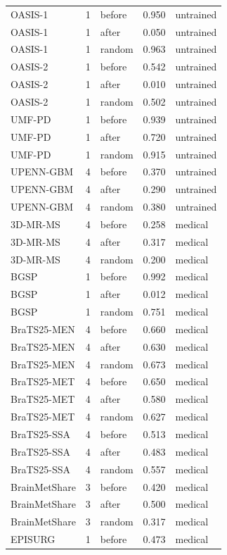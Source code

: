 \begin{tabular}{lrlrl}
OASIS-1 & 1 & before & 0.950 & untrained \\
OASIS-1 & 1 & after & 0.050 & untrained \\
OASIS-1 & 1 & random & 0.963 & untrained \\
OASIS-2 & 1 & before & 0.542 & untrained \\
OASIS-2 & 1 & after & 0.010 & untrained \\
OASIS-2 & 1 & random & 0.502 & untrained \\
UMF-PD & 1 & before & 0.939 & untrained \\
UMF-PD & 1 & after & 0.720 & untrained \\
UMF-PD & 1 & random & 0.915 & untrained \\
UPENN-GBM & 4 & before & 0.370 & untrained \\
UPENN-GBM & 4 & after & 0.290 & untrained \\
UPENN-GBM & 4 & random & 0.380 & untrained \\
3D-MR-MS & 4 & before & 0.258 & medical \\
3D-MR-MS & 4 & after & 0.317 & medical \\
3D-MR-MS & 4 & random & 0.200 & medical \\
BGSP & 1 & before & 0.992 & medical \\
BGSP & 1 & after & 0.012 & medical \\
BGSP & 1 & random & 0.751 & medical \\
BraTS25-MEN & 4 & before & 0.660 & medical \\
BraTS25-MEN & 4 & after & 0.630 & medical \\
BraTS25-MEN & 4 & random & 0.673 & medical \\
BraTS25-MET & 4 & before & 0.650 & medical \\
BraTS25-MET & 4 & after & 0.580 & medical \\
BraTS25-MET & 4 & random & 0.627 & medical \\
BraTS25-SSA & 4 & before & 0.513 & medical \\
BraTS25-SSA & 4 & after & 0.483 & medical \\
BraTS25-SSA & 4 & random & 0.557 & medical \\
BrainMetShare & 3 & before & 0.420 & medical \\
BrainMetShare & 3 & after & 0.500 & medical \\
BrainMetShare & 3 & random & 0.317 & medical \\
EPISURG & 1 & before & 0.473 & medical \\

\end{tabular}
